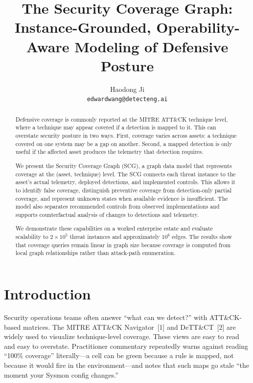 \documentclass[10pt]{article}
\title{\textbf{The Security Coverage Graph:}\\[2pt]\large Instance-Grounded, Operability-Aware Modeling of Defensive Posture}
\author{Haodong Ji\\\texttt{edwardwang@detecteng.ai}}
\date{}
\begin{document}
\maketitle

\begin{abstract}
Defensive coverage is commonly reported at the MITRE ATT\&CK technique level, where a technique may appear covered if a detection is mapped to it. This can overstate security posture in two ways. First, coverage varies across assets: a technique covered on one system may be a gap on another. Second, a mapped detection is only useful if the affected asset produces the telemetry that detection requires.

We present the Security Coverage Graph (SCG), a graph data model that represents coverage at the (asset, technique) level. The SCG connects each threat instance to the asset's actual telemetry, deployed detections, and implemented controls. This allows it to identify false coverage, distinguish preventive coverage from detection-only partial coverage, and represent unknown states when available evidence is insufficient. The model also separates recommended controls from observed implementations and supports counterfactual analysis of changes to detections and telemetry.

We demonstrate these capabilities on a worked enterprise estate and evaluate scalability to $2\times10^5$ threat instances and approximately $10^6$ edges. The results show that coverage queries remain linear in graph size because coverage is computed from local graph relationships rather than attack-path enumeration.
\end{abstract}

\section{Introduction}
Security operations teams often answer ``what can we detect?'' with ATT\&CK-based matrices. The MITRE ATT\&CK Navigator~[1] and DeTT\&CT~[2] are widely used to visualize technique-level coverage. These views are easy to read and easy to overstate. Practitioner commentary repeatedly warns against reading ``100\% coverage'' literally---a cell can be green because a rule is mapped, not because it would fire in the environment---and notes that such maps go stale ``the moment your Sysmon config changes.''
\end{document}
